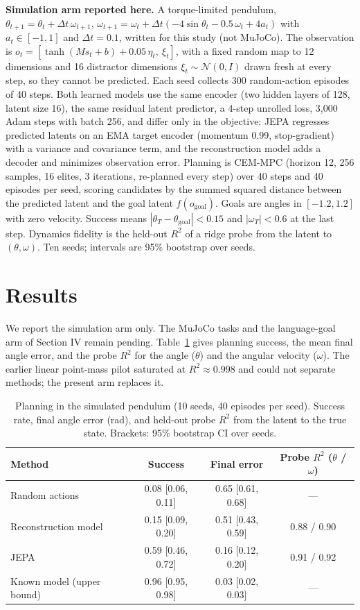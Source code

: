 \documentclass[conference]{IEEEtran}
\begin{document}
\textbf{Simulation arm reported here.} A torque-limited pendulum, $\theta_{t+1}=\theta_t+\Delta t\,\omega_{t+1}$, $\omega_{t+1}=\omega_t+\Delta t(-4\sin\theta_t-0.5\,\omega_t+4a_t)$ with $a_t\in[-1,1]$ and $\Delta t=0.1$, written for this study (not MuJoCo). The observation is $o_t=[\tanh(M s_t+b)+0.05\,\eta_t,\ \xi_t]$, with a fixed random map to 12 dimensions and 16 distractor dimensions $\xi_t\sim\mathcal{N}(0,I)$ drawn fresh at every step, so they cannot be predicted. Each seed collects 300 random-action episodes of 40 steps. Both learned models use the same encoder (two hidden layers of 128, latent size 16), the same residual latent predictor, a 4-step unrolled loss, 3{,}000 Adam steps with batch 256, and differ only in the objective: JEPA regresses predicted latents on an EMA target encoder (momentum 0.99, stop-gradient) with a variance and covariance term, and the reconstruction model adds a decoder and minimizes observation error. Planning is CEM-MPC (horizon 12, 256 samples, 16 elites, 3 iterations, re-planned every step) over 40 steps and 40 episodes per seed, scoring candidates by the summed squared distance between the predicted latent and the goal latent $f(o_{\mathrm{goal}})$. Goals are angles in $[-1.2,1.2]$ with zero velocity. Success means $|\theta_T-\theta_{\mathrm{goal}}|<0.15$ and $|\omega_T|<0.6$ at the last step. Dynamics fidelity is the held-out $R^2$ of a ridge probe from the latent to $(\theta,\omega)$. Ten seeds; intervals are 95\% bootstrap over seeds.

\section{Results}
We report the simulation arm only. The MuJoCo tasks and the language-goal arm of Section IV remain pending. Table~\ref{tab:wm} gives planning success, the mean final angle error, and the probe $R^2$ for the angle ($\theta$) and the angular velocity ($\omega$). The earlier linear point-mass pilot saturated at $R^2\approx 0.998$ and could not separate methods; the present arm replaces it.

\begin{table}[!t]
\caption{Planning in the simulated pendulum (10 seeds, 40 episodes per seed). Success rate, final angle error (rad), and held-out probe $R^2$ from the latent to the true state. Brackets: 95\% bootstrap CI over seeds.}
\label{tab:wm}
\centering
\small
\begin{tabular}{lccc}
\hline
Method & Success & Final error & Probe $R^2$ ($\theta$ / $\omega$) \\
\hline
Random actions & 0.08 [0.06, 0.11] & 0.65 [0.61, 0.68] & --- \\
Reconstruction model & 0.15 [0.09, 0.20] & 0.51 [0.43, 0.59] & 0.88 / 0.90 \\
JEPA & 0.59 [0.46, 0.72] & 0.16 [0.12, 0.20] & 0.91 / 0.92 \\
Known model (upper bound) & 0.96 [0.95, 0.98] & 0.03 [0.02, 0.03] & --- \\
\hline
\end{tabular}
\end{table}
\end{document}

